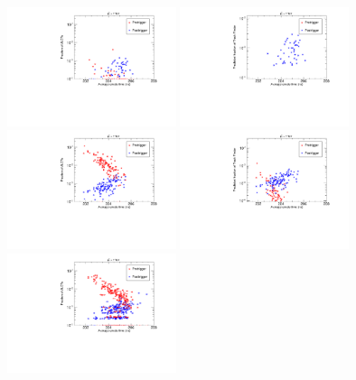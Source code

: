 \begin{figure}
  \begin{center}
      \includegraphics[clip=true, trim=0.0cm 0cm 0.0cm 0cm, width=0.44\textwidth]{figures/timing/ME11_Anode_vs_all3}
      \includegraphics[clip=true, trim=0.0cm 0cm 0.0cm 0cm, width=0.44\textwidth]{figures/timing/ME11_Anode_vs_TF_all} \\
      \includegraphics[clip=true, trim=0.0cm 0cm 0.0cm 0cm, width=0.44\textwidth]{figures/timing/Ring1_not11_Anode_vs_all3}
      \includegraphics[clip=true, trim=0.0cm 0cm 0.0cm 0cm, width=0.44\textwidth]{figures/timing/Ring1_not11_Anode_vs_TF_all} \\
      \includegraphics[clip=true, trim=0.0cm 0cm 0.0cm 0cm, width=0.44\textwidth]{figures/timing/Ring2_Anode_vs_all3}

\end{center}
\end{figure}
